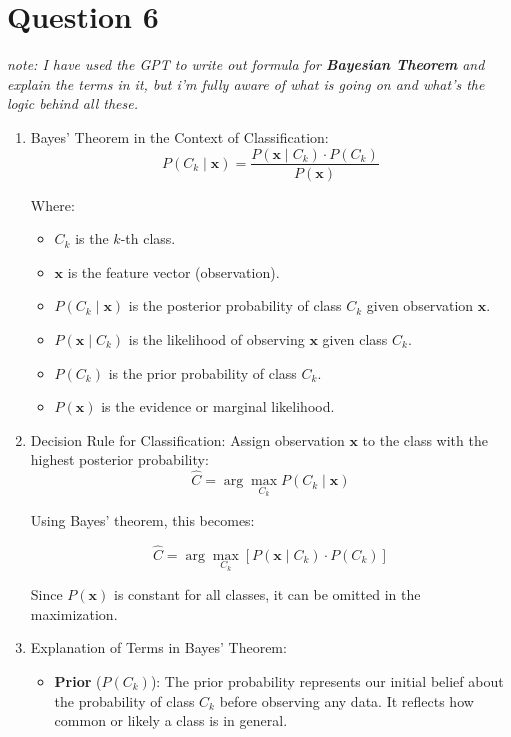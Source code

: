 \documentclass[a4paper,12pt]{article}
\begin{document}
\section*{Question 6}
\textit{note: I have used the GPT to write out formula for \textbf{Bayesian Theorem} and explain the terms in it, but i'm fully aware of what is going on and what's the logic behind all these.}
\begin{enumerate}[label=(\alph*)]
    \item Bayes' Theorem in the Context of Classification:
    \[
    P(C_k \mid \mathbf{x}) = \frac{P(\mathbf{x} \mid C_k) \cdot P(C_k)}{P(\mathbf{x})}
    \]

    Where:
    \begin{itemize}
        \item $C_k$ is the $k$-th class.
        \item $\mathbf{x}$ is the feature vector (observation).
        \item $P(C_k \mid \mathbf{x})$ is the posterior probability of class $C_k$ given observation $\mathbf{x}$.
        \item $P(\mathbf{x} \mid C_k)$ is the likelihood of observing $\mathbf{x}$ given class $C_k$.
        \item $P(C_k)$ is the prior probability of class $C_k$.
        \item $P(\mathbf{x})$ is the evidence or marginal likelihood.
    \end{itemize}

    \item Decision Rule for Classification:
    Assign observation $\mathbf{x}$ to the class with the highest posterior probability:
    \[
    \hat{C} = \arg\max_{C_k} P(C_k \mid \mathbf{x})
    \]

    Using Bayes' theorem, this becomes:

    \[
    \hat{C} = \arg\max_{C_k} \left[ P(\mathbf{x} \mid C_k) \cdot P(C_k) \right]
    \]

    Since $P(\mathbf{x})$ is constant for all classes, it can be omitted in the maximization.

    \item Explanation of Terms in Bayes' Theorem:
    \begin{itemize}
        \item \textbf{Prior} ($P(C_k)$): The prior probability represents our initial belief about the probability of class $C_k$ before observing any data. It reflects how common or likely a class is in general.


\end{itemize}
\end{enumerate}
\end{document}
